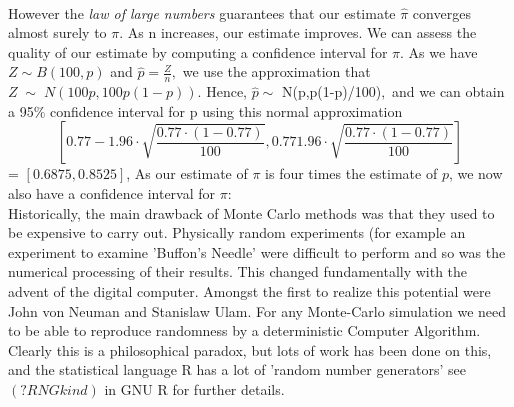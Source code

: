 \documentclass[a4paper,10pt]{article}
\newenvironment{example}[1][Example]{\begin{trivlist}
\item[\hskip \labelsep {\bfseries #1}]}{\end{trivlist}}
\begin{document}
\begin{example}[A raindrop experiment for computing $\pi$]
   \paragraph{} However the \textit{law of large numbers} guarantees that our estimate $\hat{\pi}$ converges
   almost surely to $\pi$. As n increases, our estimate improves. 
   We can assess the quality of our estimate by computing a confidence interval for $\pi$.
   As we have $Z \sim B(100,p)$ and $\hat{p} = \frac{Z}{n},$ we use the approximation that $Z \;\sim\;N(100p,100p(1-p)).
   $ Hence, $\hat{p} \sim $ N(p,p(1-p)/100)$,$ and we can obtain a 95$\%$ confidence interval for p using this normal
   approximation
   \begin{equation*}
    \left[ 0.77 - 1.96\cdot \sqrt{\frac{0.77\cdot(1-0.77)}{100}}, 0.77  1.96\cdot \sqrt{\frac{0.77\cdot(1-0.77)}{100}}\right]
   \end{equation*}
= $[0.6875,0.8525]$,
As our estimate of $\pi$ is four times the estimate of $p$, we now also have a confidence interval for $\pi$:
\begin{equation*}
 [2.750,3.410]
\end{equation*}
Historically, the main drawback of Monte Carlo methods was that they used to be expensive to carry out.
Physically random experiments (for example an experiment to examine 'Buffon's Needle' were difficult to perform 
and so was the numerical processing of their results.
   This changed fundamentally with the advent of the digital computer. Amongst the first to realize this
   potential were John von Neuman and Stanislaw Ulam. 
 For any Monte-Carlo simulation we need to be able to reproduce randomness by a deterministic Computer Algorithm.
 Clearly this is a philosophical paradox, but lots of work has been done on this, and the statistical language R has
 a lot of 'random number generators' see $(?RNGkind)$ in GNU R for further details. 
  
\end{example}

 
\end{document}
